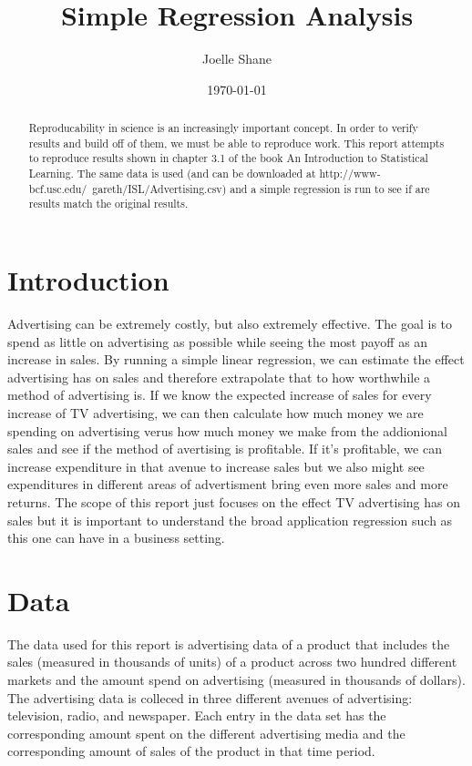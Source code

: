 \documentclass{article}\usepackage[]{graphicx}\usepackage[]{color}
\title{Simple Regression Analysis}
\author{Joelle Shane}
\date{\today}
\begin{document}
\maketitle

\begin{abstract}
Reproducability in science is an increasingly important concept. In order to verify results and build off of them, we must be able to reproduce work. This report attempts to reproduce results shown in chapter 3.1 of the book An Introduction to Statistical Learning. The same data is used (and can be downloaded at http://www-bcf.usc.edu/~gareth/ISL/Advertising.csv) and a simple regression is run to see if are results match the original results. 
\end{abstract}

\section{Introduction}

Advertising can be extremely costly, but also extremely effective. The goal is to spend as little on advertising as possible while seeing the most payoff as an increase in sales. By running a simple linear regression, we can estimate the effect advertising has on sales and therefore extrapolate that to how worthwhile a method of advertising is. If we know the expected increase of sales for every increase of TV advertising, we can then calculate how much money we are spending on advertising verus how much money we make from the addionional sales and see if the method of avertising is profitable. If it's profitable, we can increase expenditure in that avenue to increase sales but we also might see expenditures in different areas of advertisment bring even more sales and more returns. The scope of this report just focuses on the effect TV advertising has on sales but it is important to understand the broad application regression such as this one can have in a business setting. 

\section{Data}

The data used for this report is advertising data of a product that includes the sales (measured in thousands of units) of a product across two hundred different markets and the amount spend on advertising (measured in thousands of dollars). The advertising data is colleced in three different avenues of advertising: television, radio, and newspaper. Each entry in the data set has the corresponding amount spent on the different advertising media and the corresponding amount of sales of the product in that time period. 
\end{document}
